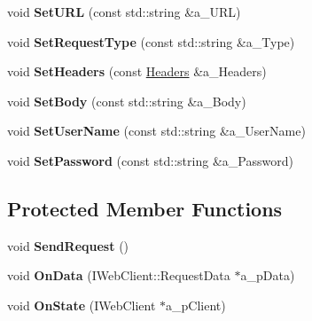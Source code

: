 \begin{DoxyCompactItemize}
\mbox{\label{class_rest_gesture_a4d162d3bf24c609ecbef972ce4106548}} 
void {\bfseries Set\+U\+RL} (const std\+::string \&a\+\_\+\+U\+RL)
\item 
\mbox{\label{class_rest_gesture_aa7b00dd7288c02c5734d26307d24b133}} 
void {\bfseries Set\+Request\+Type} (const std\+::string \&a\+\_\+\+Type)
\item 
\mbox{\label{class_rest_gesture_a31ccfc94a60ef18a27654687811868d1}} 
void {\bfseries Set\+Headers} (const \hyperlink{class_rest_gesture_a4a175cc9d5bccdc4a21aed300daaf3a0}{Headers} \&a\+\_\+\+Headers)
\item 
\mbox{\label{class_rest_gesture_a1a127667476e3142509708fba5e0efdc}} 
void {\bfseries Set\+Body} (const std\+::string \&a\+\_\+\+Body)
\item 
\mbox{\label{class_rest_gesture_ac4c643f8e46893be6927bff113e46349}} 
void {\bfseries Set\+User\+Name} (const std\+::string \&a\+\_\+\+User\+Name)
\item 
\mbox{\label{class_rest_gesture_ac7588eae74ab37cf69bf3b07d7e7baa0}} 
void {\bfseries Set\+Password} (const std\+::string \&a\+\_\+\+Password)
\end{DoxyCompactItemize}
\subsection*{Protected Member Functions}
\begin{DoxyCompactItemize}
\item 
\mbox{\label{class_rest_gesture_a108359b9efddfa82d0937e9e6be25719}} 
void {\bfseries Send\+Request} ()
\item 
\mbox{\label{class_rest_gesture_affaed5569ce356ae32df7cb7069cf9b1}} 
void {\bfseries On\+Data} (I\+Web\+Client\+::\+Request\+Data $\ast$a\+\_\+p\+Data)
\item 
\mbox{\label{class_rest_gesture_a0edfb9ae024ca7d2d1a77da59ec07960}} 
void {\bfseries On\+State} (I\+Web\+Client $\ast$a\+\_\+p\+Client)
\end{DoxyCompactItemize}

